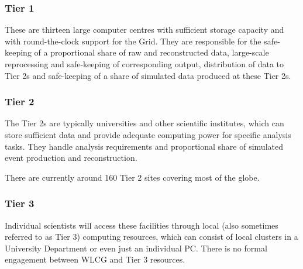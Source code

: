 \subsubsection{Tier 1}

These are thirteen large computer centres with sufficient storage capacity and with round-the-clock support for the Grid. They are responsible for the safe-keeping of a proportional share of raw and reconstructed data, large-scale reprocessing and safe-keeping of corresponding output, distribution of data to Tier 2s and safe-keeping of a share of simulated data produced at these Tier 2s.

\subsubsection{Tier 2}

The Tier 2s are typically universities and other scientific institutes, which can store sufficient data and provide adequate computing power for specific analysis tasks. They handle analysis requirements and proportional share of simulated event production and reconstruction.

There are currently around 160 Tier 2 sites covering most of the globe.

\subsubsection{Tier 3}

Individual scientists will access these facilities through local (also sometimes referred to as Tier 3) computing resources, which can consist of local clusters in a University Department or even just an individual PC. There is no formal engagement between WLCG and Tier 3 resources. 

